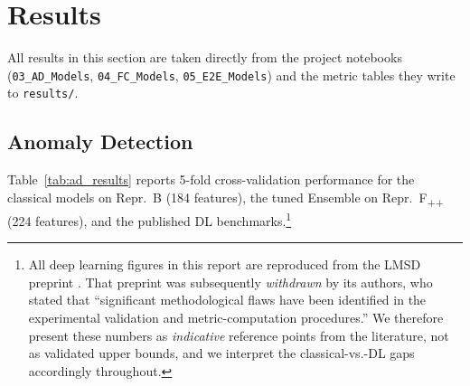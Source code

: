 \section{Results}
\label{sec:results}

All results in this section are taken directly from the project notebooks
(\texttt{03\_AD\_Models}, \texttt{04\_FC\_Models}, \texttt{05\_E2E\_Models}) and
the metric tables they write to \texttt{results/}.

\subsection{Anomaly Detection}
\label{subsec:results_ad}

Table~\ref{tab:ad_results} reports 5-fold cross-validation performance for the
classical models on Repr.~B (184 features), the tuned Ensemble on
Repr.~F\textsubscript{++} (224 features), and the published DL
benchmarks.\footnote{All deep learning figures in this report are reproduced
from the LMSD preprint \cite{lmsd2025}. That preprint was subsequently
\emph{withdrawn} by its authors, who stated that ``significant methodological
flaws have been identified in the experimental validation and metric-computation
procedures.'' We therefore present these numbers as \emph{indicative} reference
points from the literature, not as validated upper bounds, and we interpret the
classical-vs.-DL gaps accordingly throughout.}

